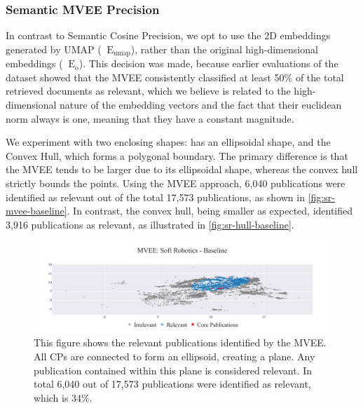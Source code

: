 \subsubsection{Semantic MVEE Precision}
\newcommand{\eumap}{\mathop{}\!\mathrm{E_{umap}}}
\newcommand{\eo}{\mathop{}\!\mathrm{E_{o}}}

In contrast to Semantic Cosine Precision, we opt to use the 2D embeddings generated by UMAP ($\eumap$), rather than the original high-dimensional embeddings ($\eo$). This decision was made, because earlier evaluations of the dataset showed that the MVEE consistently classified at least 50\% of the total retrieved documents as relevant, which we believe is related to the high-dimensional nature of the embedding vectors and the fact that their euclidean norm always is one, meaning that they have a constant magnitude.

We experiment with two enclosing shapes: has an ellipsoidal shape, and the Convex Hull, which forms a polygonal boundary.  The primary difference is that the MVEE tends to be larger due to its ellipsoidal shape, whereas the convex hull strictly bounds the points. Using the MVEE approach, 6,040 publications were identified as relevant out of the total 17,573 publications, as shown in \autoref{fig:sr-mvee-baseline}. In contrast, the convex hull, being smaller as expected, identified 3,916 publications as relevant, as illustrated in \autoref{fig:sr-hull-baseline}.

\begin{figure}[!hb]
	\hspace*{-1cm}	
	\includegraphics[scale=0.45]{pics/sr-mvee-baseline.pdf}
	\caption[Semantic MVEE: Soft Robotics]{This figure shows the relevant publications identified by the MVEE. All CPs are connected to form an ellipsoid, creating a plane. Any publication contained within this plane is considered relevant. In total 6,040 out of 17,573 publications were identified as relevant, which is 34\%.}\label{fig:sr-mvee-baseline}
\end{figure}

